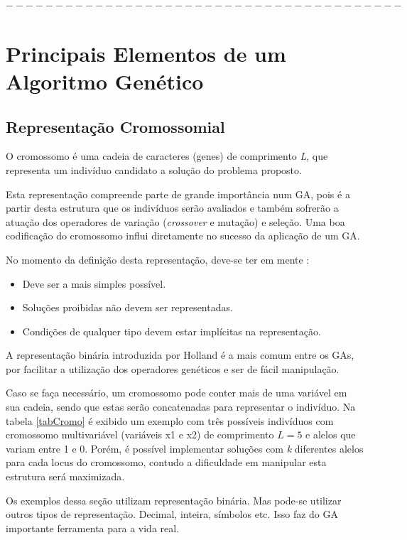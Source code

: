 $----------------------------------------$

\section{Principais Elementos de um Algoritmo Genético}
	
	\subsection{Representação Cromossomial}

	O cromossomo é uma cadeia de caracteres (genes) de comprimento \textit{L}, que representa um indivíduo candidato a solução do problema proposto.
	
	Esta representação compreende parte de grande importância num GA, pois é a partir desta estrutura que os indivíduos serão avaliados e também sofrerão a atuação dos operadores de variação (\textit{crossover} e mutação) e seleção. Uma boa codificação do cromossomo influi diretamente no sucesso da aplicação de um GA.
	
	No momento da definição desta representação, deve-se ter em mente \cite{Linden2008}:
	
	\begin{itemize}
\item Deve ser a mais simples possível.
\item Soluções proibidas não devem ser representadas. 
\item Condições de qualquer tipo devem estar implícitas na representação.
\end{itemize} 
	
	A representação binária introduzida por Holland \cite{Holland} é a mais comum entre os GAs, por facilitar a utilização dos operadores genéticos e ser de fácil manipulação.
	
	Caso se faça necessário, um cromossomo pode conter mais de uma variável em sua cadeia, sendo que estas serão concatenadas para representar o indivíduo. Na tabela \ref{tabCromo} é exibido um exemplo com três possíveis indivíduos com cromossomo multivariável (variáveis x1 e x2) de comprimento $L = 5$ e alelos que variam entre 1 e 0. Porém, é possível implementar soluções com \textit{k} diferentes alelos para cada locus do cromossomo, contudo a dificuldade em manipular esta estrutura será maximizada.
	
	Os exemplos dessa seção utilizam representação binária. Mas pode-se utilizar outros tipos de representação. Decimal, inteira, símbolos etc. Isso faz do GA importante ferramenta para a vida real.
		
